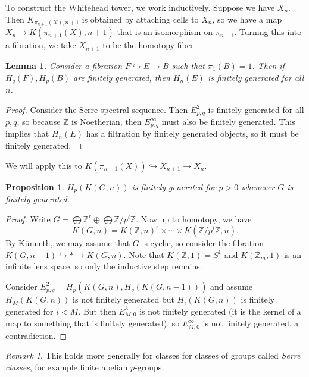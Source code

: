 \documentclass[leqno, openany]{memoir}
\newtheorem{prop}[thm]{Proposition}
\newtheorem{lem}[thm]{Lemma}
\theoremstyle{definition}
\theoremstyle{remark}
\newtheorem{rmk}[thm]{Remark}
\theoremstyle{plain}
\theoremstyle{definition}
\theoremstyle{remark}
\newcommand{\Z}{\mathbb{Z}}
\begin{document}
To construct the Whitehead tower, we work inductively. Suppose we have $X_n$.
Then $K_{\pi_{n+1}(X), n+1}$ is obtained by attaching cells to $X_n$, so we
have a map $X_n \to K(\pi_{n+1}(X), n+1)$ that is an isomorphism on
$\pi_{n+1}$. Turning this into a fibration, we take $X_{n+1}$ to be the
homotopy fiber.

\begin{lem} Consider a fibration $F \hookrightarrow E \to B$ such that
$\pi_1(B) = 1$. Then if $H_q(F), H_p(B)$ are finitely generated, then $H_n(E)$
is finitely generated for all $n$.  \end{lem}

\begin{proof} Consider the Serre spectral sequence. Then $E_{p,q}^2$ is
    finitely generated for all $p,q$, so because $\Z$ is Noetherian, then
    $E_{p,q}^{\infty}$ must also be finitely generated. This implies that
    $H_n(E)$ has a filtration by finitely generated objects, so it must be
    finitely generated.  \end{proof}

We will apply this to $K(\pi_{n+1}(X)) \hookrightarrow X_{n+1} \to X_n$.

\begin{prop} $H_p(K(G, n))$ is finitely generated for $p>0$ whenever $G$ is
finitely generated.  \end{prop}

\begin{proof} Write $G = \bigoplus \Z^r \oplus \bigoplus \Z/p^i \Z$. Now up to
    homotopy, we have \[ K(G, n) = {K(\Z, n)}^r \times \cdots \times K(\Z/p^i
    \Z, n). \] By K\"unneth, we may assume that $G$ is cyclic, so consider the
    fibration $K(G, n-1) \hookrightarrow * \to K(G,n)$. Note that $K(\Z,1) =
    S^1$ and $K(\Z_m,1)$ is an infinite lens space, so only the inductive step
    remains.

    Consider $E_{p,q}^2 = H_p(K(G,n), H_q(K(G, n-1)))$ and assume $H_M(K(G,
n))$ is not finitely generated but $H_i(K(G, n))$ is finitely generated for $i
< M$. But then $E_{M,0}^3$ is not finitely generated (it is the kernel of a map
to something that is finitely generated), so $E_{M,0}^{\infty}$ is not finitely
generated, a contradiction.  \end{proof}

\begin{rmk} This holds more generally for classes for classes of groups called
\textit{Serre classes}, for example finite abelian $p$-groups.  \end{rmk}
\end{document}
